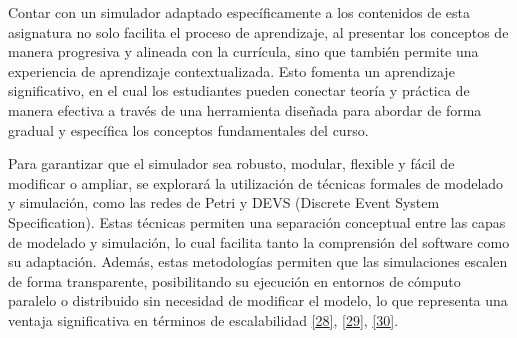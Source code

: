 \documentclass[12pt,oneside]{templates/unerthesis}
\begin{document}
\begin{table}[!h]
\centering
\caption{\label{tab:funcionalidadessimulador}Funcionalidades principales del simulador propuesto}
\centering
{}
\end{table}

Contar con un simulador adaptado específicamente a los contenidos de esta asignatura no solo facilita el proceso de aprendizaje, al presentar los conceptos de manera progresiva y alineada con la currícula, sino que también permite una experiencia de aprendizaje contextualizada. Esto fomenta un aprendizaje significativo, en el cual los estudiantes pueden conectar teoría y práctica de manera efectiva a través de una herramienta diseñada para abordar de forma gradual y específica los conceptos fundamentales del curso.

Para garantizar que el simulador sea robusto, modular, flexible y fácil de modificar o ampliar, se explorará la utilización de técnicas formales de modelado y simulación, como las redes de Petri y DEVS (Discrete Event System Specification). Estas técnicas permiten una separación conceptual entre las capas de modelado y simulación, lo cual facilita tanto la comprensión del software como su adaptación. Además, estas metodologías permiten que las simulaciones escalen de forma transparente, posibilitando su ejecución en entornos de cómputo paralelo o distribuido sin necesidad de modificar el modelo, lo que representa una ventaja significativa en términos de escalabilidad \protect\hyperlink{ref-peterson_petri_1981}{{[}28{]}}, \protect\hyperlink{ref-zeigler_theory_2000}{{[}29{]}}, \protect\hyperlink{ref-zeigler_theory_2018}{{[}30{]}}.
\end{document}
